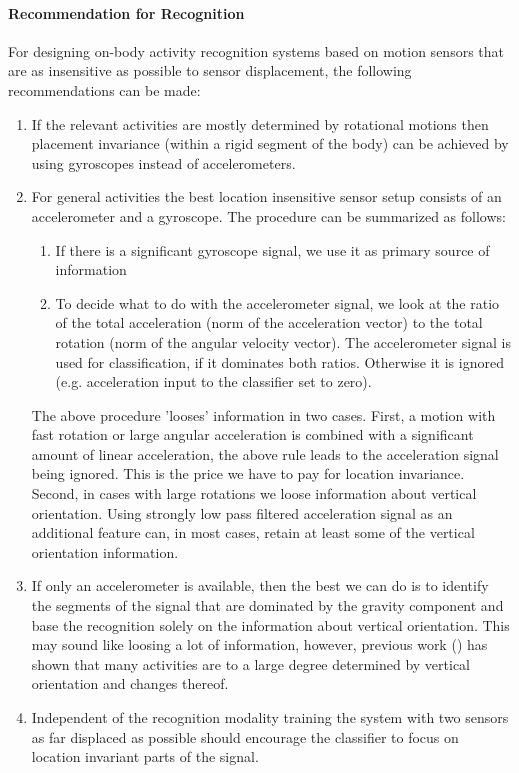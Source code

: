 \paragraph{Recommendation for Recognition}
For designing
on-body activity recognition systems based on motion sensors that are as insensitive as possible to sensor displacement, the following recommendations can be made:
\begin{enumerate}
\item If the relevant activities are mostly determined by
  rotational motions then placement invariance (within a rigid segment
  of the body) can be achieved by using gyroscopes instead of
  accelerometers.
\item  For general activities the best location insensitive sensor setup consists of an
  accelerometer and a gyroscope. The procedure can be summarized as follows:
\begin{enumerate}
\item  If there is a significant gyroscope signal, we use it as
  primary source of information
\item  To decide what to do with the accelerometer signal, we look at
  the ratio of the total acceleration (norm of the acceleration
  vector) to the total rotation (norm of the angular velocity vector).
  The accelerometer signal is used for classification, if it dominates
  both ratios. Otherwise it is  ignored (e.g. acceleration input to the
  classifier set to zero).
\end{enumerate}
The above procedure 'looses' information in two cases. First, a motion with 
fast rotation or large angular
acceleration is combined with a significant amount of linear acceleration, the
above rule leads to the acceleration signal being ignored.  This is
the price we have to pay for location invariance. Second, in
cases with large rotations we loose information about
vertical orientation. Using strongly low pass filtered acceleration
signal as an additional feature can, in most cases, retain at least
some of the vertical orientation information.
\item If only an accelerometer is available, then the best we can
  do is to identify the segments of the signal that are dominated by
  the gravity component and base the recognition solely on the
  information about vertical orientation. This may sound like loosing
  a lot of information, however, previous work (\cite{kern2003wsa,
    Zinnen:2008p631}) has shown that many activities are to a large degree
  determined by vertical orientation and changes thereof. 
\item Independent of the recognition modality training the system with
  two sensors as far displaced as possible should encourage the
  classifier to focus on location invariant parts of the signal.
\end{enumerate}

